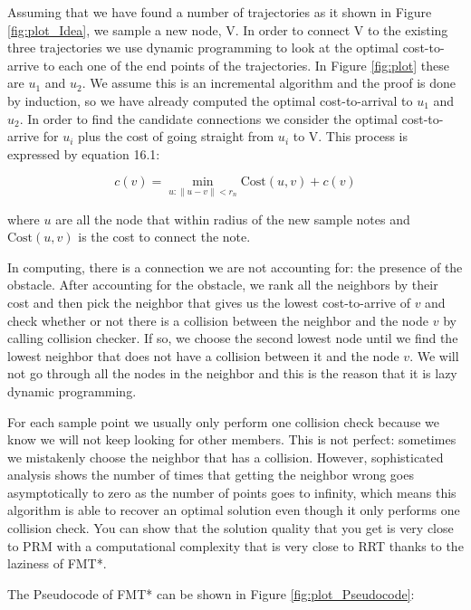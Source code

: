 \documentclass[twoside]{article}
\begin{document}
Assuming that we have found a number of trajectories as it shown in Figure \ref{fig:plot_Idea}, we sample a new node, V. In order to connect V to the existing three trajectories we use dynamic programming to look at the optimal cost-to-arrive to each one of the end points of the trajectories. In Figure \ref{fig:plot} these are $u_1$ and $u_2$. We assume this is an incremental algorithm and the proof is done by induction,  so we have already computed the optimal cost-to-arrival to $u_1$ and $u_2$. In order to find the candidate connections we consider the optimal cost-to-arrive for $u_i$ plus the cost of going straight from $u_i$ to V. This process is expressed by equation 16.1:
 
\begin{equation}
    c(v) = \min_{u:\|u - v\| < r_n} \text{Cost}(u, v) + c(v)
\end{equation}

where $u$ are all the node that within radius of the new sample notes and $\text{Cost}(u, v)$ is the cost to connect the note.

In computing, there is a connection we are not accounting for: the presence of the obstacle. After accounting for the obstacle, we rank all the neighbors by their cost and then pick the neighbor that gives us the lowest cost-to-arrive of $v$ and check whether or not there is a collision between the neighbor and the node $v$ by calling collision checker. If so, we choose the second lowest node until we find the lowest neighbor that does not have a collision between it and the node $v$. We will not go through all the nodes in the neighbor and this is the reason that it is lazy dynamic programming. 

For each sample point we usually only perform one collision check because we know we will not keep looking for other members. This is not perfect: sometimes we mistakenly choose the neighbor that has a collision. However, sophisticated analysis shows the number of times that getting the neighbor wrong goes asymptotically to zero as the number of points goes to infinity, which means this algorithm is able to recover an optimal solution even though it only performs one collision check. You can show that the solution quality that you get is very close to PRM with a computational complexity that is very close to RRT thanks to the laziness of FMT*.

The Pseudocode of FMT* can be shown in Figure \ref{fig:plot_Pseudocode}:
\end{document}
